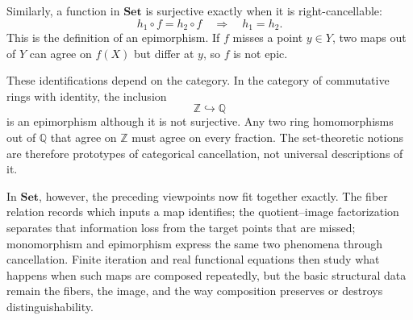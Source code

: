 Similarly, a function in \(\mathbf{Set}\) is surjective exactly when it is right-cancellable:
\[
  h_1\circ f=h_2\circ f
  \quad\Longrightarrow\quad
  h_1=h_2.
\]
This is the definition of an epimorphism.  If \(f\) misses a point \(y\in Y\), two maps out of \(Y\) can agree on \(f(X)\) but differ at \(y\), so \(f\) is not epic.

These identifications depend on the category.  In the category of commutative rings with identity, the inclusion
\[
  \mathbb Z\hookrightarrow\mathbb Q
\]
is an epimorphism although it is not surjective.  Any two ring homomorphisms out of \(\mathbb Q\) that agree on \(\mathbb Z\) must agree on every fraction.  The set-theoretic notions are therefore prototypes of categorical cancellation, not universal descriptions of it.

In \(\mathbf{Set}\), however, the preceding viewpoints now fit together exactly.  The fiber relation records which inputs a map identifies; the quotient--image factorization separates that information loss from the target points that are missed; monomorphism and epimorphism express the same two phenomena through cancellation.  Finite iteration and real functional equations then study what happens when such maps are composed repeatedly, but the basic structural data remain the fibers, the image, and the way composition preserves or destroys distinguishability.
